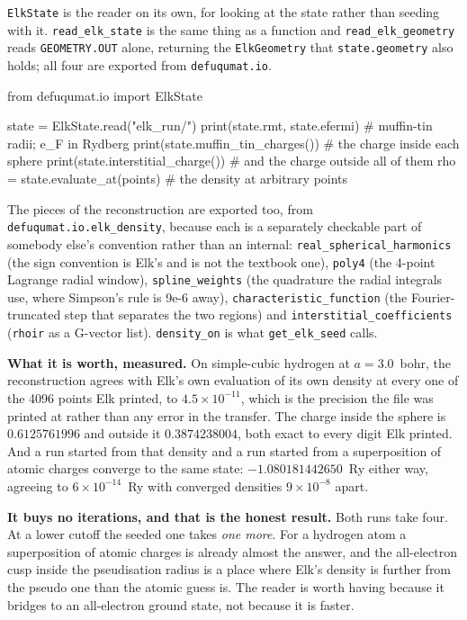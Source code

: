 \documentclass[11pt,a4paper]{article}
\newcommand{\code}[1]{\texttt{\small #1}}
\begin{document}
\code{ElkState} is the reader on its own, for looking at the state rather than
seeding with it. \code{read\_elk\_state} is the same thing as a function and
\code{read\_elk\_geometry} reads \code{GEOMETRY.OUT} alone, returning the
\code{ElkGeometry} that \code{state.geometry} also holds; all four are exported
from \code{defuqumat.io}.

\begin{pycode}
from defuqumat.io import ElkState

state = ElkState.read("elk_run/")
print(state.rmt, state.efermi)            # muffin-tin radii; e_F in Rydberg
print(state.muffin_tin_charges())         # the charge inside each sphere
print(state.interstitial_charge())        # and the charge outside all of them
rho = state.evaluate_at(points)           # the density at arbitrary points
\end{pycode}

The pieces of the reconstruction are exported too, from
\code{defuqumat.io.elk\_density}, because each is a separately checkable part of
somebody else's convention rather than an internal:
\code{real\_spherical\_harmonics} (the sign convention is Elk's and is not the
textbook one), \code{poly4} (the 4-point Lagrange radial window),
\code{spline\_weights} (the quadrature the radial integrals use, where Simpson's
rule is 9e-6 away), \code{characteristic\_function} (the Fourier-truncated step
that separates the two regions) and \code{interstitial\_coefficients}
(\code{rhoir} as a G-vector list). \code{density\_on} is what
\code{get\_elk\_seed} calls.

\textbf{What it is worth, measured.} On simple-cubic hydrogen at $a = 3.0$~bohr,
the reconstruction agrees with Elk's own evaluation of its own density at every
one of the 4096 points Elk printed, to $4.5\times10^{-11}$, which is the
precision the file was printed at rather than any error in the transfer. The
charge inside the sphere is $0.6125761996$ and outside it $0.3874238004$, both
exact to every digit Elk printed. And a run started from that density and a run
started from a superposition of atomic charges converge to the same state:
$-1.080181442650$~Ry either way, agreeing to $6\times10^{-14}$~Ry with converged
densities $9\times10^{-8}$ apart.

\textbf{It buys no iterations, and that is the honest result.} Both runs take
four. At a lower cutoff the seeded one takes \emph{one more}. For a hydrogen
atom a superposition of atomic charges is already almost the answer, and the
all-electron cusp inside the pseudisation radius is a place where Elk's density
is further from the pseudo one than the atomic guess is. The reader is worth
having because it bridges to an all-electron ground state, not because it is
faster.
\end{document}
